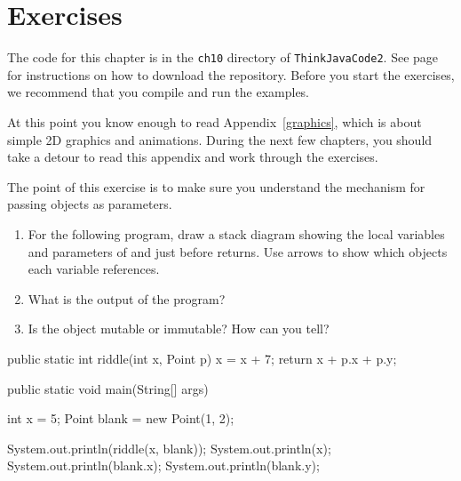 \section{Exercises}

The code for this chapter is in the {\tt ch10} directory of {\tt ThinkJavaCode2}.
See page~\pageref{code} for instructions on how to download the repository.
Before you start the exercises, we recommend that you compile and run the examples.

At this point you know enough to read Appendix~\ref{graphics}, which is about simple 2D graphics and animations.
During the next few chapters, you should take a detour to read this appendix and work through the exercises.


\begin{exercise}  %

The point of this exercise is to make sure you understand the mechanism for passing objects as parameters.

\begin{enumerate}

\item For the following program, draw a stack diagram showing the local variables and parameters of  and  just before  returns.
Use arrows to show which objects each variable references.

\item What is the output of the program?

\item Is the  object mutable or immutable?
How can you tell?

\end{enumerate}

\begin{code}
public static int riddle(int x, Point p) {
    x = x + 7;
    return x + p.x + p.y;
}
\end{code}

\begin{code}
public static void main(String[] args) {
    int x = 5;
    Point blank = new Point(1, 2);

    System.out.println(riddle(x, blank));
    System.out.println(x);
    System.out.println(blank.x);
    System.out.println(blank.y);
}
\end{code}

\end{exercise}


